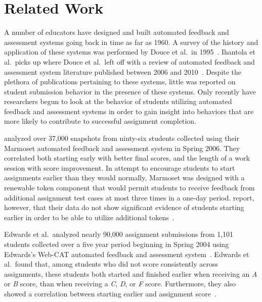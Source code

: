 \section{Related Work}

A number of educators have designed and built automated feedback and assessment
systems going back in time as far as 1960. A survey of the history and
application of these systems was performed by Douce et al.\ in
1995~\cite{Douce:2005:ATA:1163405.1163409}. Ihantola et al.\ picks up where
Douce et al.\ left off with a review of automated feedback and assessment
system literature published between 2006 and
2010~\cite{Ihantola:2010:RRS:1930464.1930480}. Despite the plethora of
publications pertaining to these systems, little was reported on student
submission behavior in the presence of these systems. Only recently have
researchers begun to look at the behavior of students utilizing automated
feedback and assessment systems in order to gain insight into behaviors that
are more likely to contribute to successful assignment completion.

\spacco{} analyzed over 37,000 snapshots from ninty-six students collected
using their Marmoset automated feedback and assessment system in Spring
2006. They correlated both starting early with better final scores, and the
length of a work session with score improvement. In attempt to encourage
students to start assignments earlier than they would normally, Marmoset was
designed with a renewable token component that would permit students to receive
feedback from additional assignment test cases at most three times in a one-day
period. \spacco{} report, however, that their data do not show significant
evidence of students starting earlier in order to be able to utilize additional
tokens~\cite{Spacco:2013:TIP:2462476.2465594, Spacco:2006:EMD:1140124.1140131}.

Edwards et al.\ analyzed nearly 90,000 assignment submissions from 1,101
students collected over a five year period beginning in Spring 2004 using
Edwards's Web-CAT automated feedback and assessment
system~\cite{Edwards:2003:RCS:949344.949390}. Edwards et al.\ found that, among
students who did not score consistently across assignments, these students both
started and finished earlier when receiving an \emph{A} or \emph{B} score, than
when receiving a \emph{C}, \emph{D}, or \emph{F} score. Furthermore, they also
showed a correlation between starting earlier and assignment
score~\cite{Edwards:2009:CEI:1584322.1584325}.

